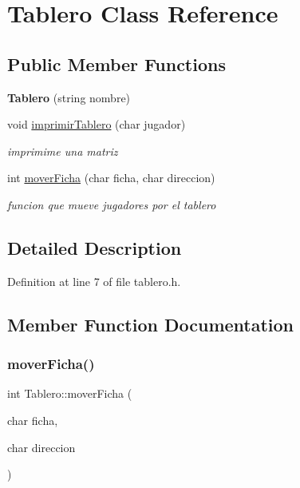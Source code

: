 \hypertarget{class_tablero}{}\section{Tablero Class Reference}
\label{class_tablero}
\subsection*{Public Member Functions}
\begin{DoxyCompactItemize}
\item 
\mbox{\label{class_tablero_a629122126dfbb099d7f0d67ba82ebaf4}} 
{\bfseries Tablero} (string nombre)
\item 
\mbox{\label{class_tablero_a79b0101958d029098ee58d8abcf84871}} 
void \hyperlink{class_tablero_a79b0101958d029098ee58d8abcf84871}{imprimir\+Tablero} (char jugador)
\begin{DoxyCompactList}\small\item\em imprimime una matriz \end{DoxyCompactList}\item 
int \hyperlink{class_tablero_ad14d7ca202c9eebc08ab8104449f5824}{mover\+Ficha} (char ficha, char direccion)
\begin{DoxyCompactList}\small\item\em funcion que mueve jugadores por el tablero \end{DoxyCompactList}\end{DoxyCompactItemize}


\subsection{Detailed Description}


Definition at line 7 of file tablero.\+h.



\subsection{Member Function Documentation}
\mbox{\label{class_tablero_ad14d7ca202c9eebc08ab8104449f5824}} 
\subsubsection{\texorpdfstring{mover\+Ficha()}{moverFicha()}}
{\footnotesize\ttfamily int Tablero\+::mover\+Ficha (\begin{DoxyParamCaption}\item[{char}]{ficha,  }\item[{char}]{direccion }\end{DoxyParamCaption})\hspace{0.3cm}{\ttfamily [inline]}}



